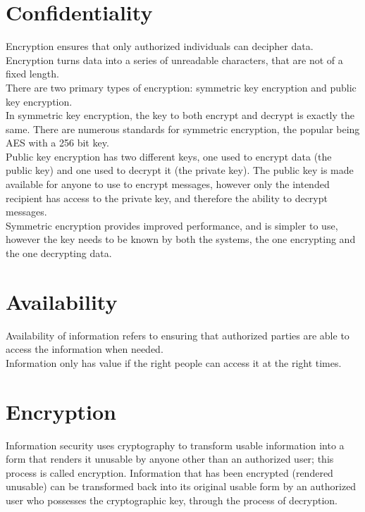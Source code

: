 \section{Confidentiality}
Encryption ensures that only authorized individuals can decipher data. Encryption turns data into a series of unreadable characters, that are not of a fixed length.\\
There are two primary types of encryption: symmetric key encryption and public key encryption.\\
In symmetric key encryption, the key to both encrypt and decrypt is exactly the same. There are numerous standards for symmetric encryption, the popular being AES with a 256 bit key.\\
Public key encryption has two different keys, one used to encrypt data (the public key) and one used to decrypt it (the private key). The public key is made available for anyone to use to encrypt messages, however only the intended recipient has access to the private key, and therefore the ability to decrypt messages.\\
Symmetric encryption provides improved performance, and is simpler to use, however the key needs to be known by both the systems, the one encrypting and the one decrypting data.\\
\section{Availability}
Availability of information refers to ensuring that authorized parties are able to access the information when needed.\\
Information only has value if the right people can access it at the right times. 
%
%
%
%
%
\section{Encryption}
Information security uses cryptography to transform usable information into a form that renders it unusable by anyone other than an authorized user; this process is called encryption. Information that has been encrypted (rendered unusable) can be transformed back into its original usable form by an authorized user who possesses the cryptographic key, through the process of decryption. \cite{InformationSecurity_Wikipedia}
%
